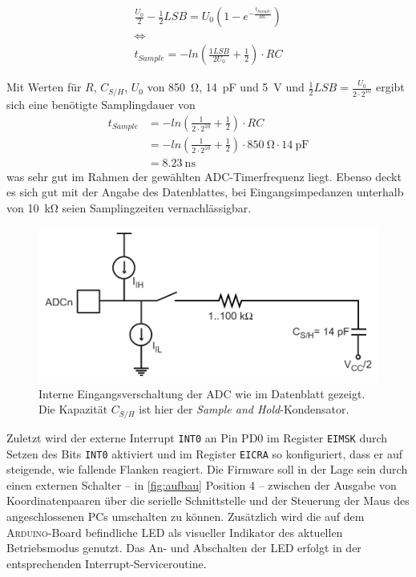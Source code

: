 		\begin{gather}
			\frac{U_0}{2} - \frac{1}{2}LSB = U_0 \left( 1 - e^{-\frac{t_{Sample}}{RC}} \right) \nonumber \\
			\Leftrightarrow \nonumber \\
			t_{Sample} = -ln\left( \frac{1LSB}{2U_0} + \frac{1}{2}\right) \cdot RC
			\label{eq:samplingzeit}
		\end{gather}

		Mit Werten für \(R\), \(C_{S/H}\), \(U_0\) von \SI{850}{\ohm}, \SI{14}{\pico\farad} und \SI{5}{\volt} und \(\frac{1}{2}LSB = \frac{U_0}{2 \cdot 2^{10}}\) ergibt sich eine benötigte Samplingdauer von
		\begin{align}
			t_{Sample}	&= -ln\left( \frac{1}{2\cdot 2^{10}} + \frac{1}{2}\right) \cdot RC \nonumber \\
						&= -ln\left( \frac{1}{2\cdot 2^{10}} + \frac{1}{2}\right) \cdot \SI{850}{\ohm} \cdot \SI{14}{\pico\farad} \nonumber \\
						&= \SI{8,23}{\nano\second}
			\label{eq:samplingzeit gerechnet}
		\end{align}
		was sehr gut im Rahmen der gewählten ADC-Timerfrequenz liegt.
		Ebenso deckt es sich gut mit der Angabe des Datenblattes, bei Eingangsimpedanzen unterhalb von \SI{10}{\kilo\ohm} seien Samplingzeiten vernachlässigbar.
		\begin{figure}[h]
			\centering
			\includegraphics[width=.8\textwidth]{fig/raster/adc-input-circuit.png}
			\caption[Interne Eingangsverschaltung der ADC]{Interne Eingangsverschaltung der ADC wie im Datenblatt gezeigt. Die Kapazität \(C_{S/H}\) ist hier der \textit{Sample and Hold}-Kondensator.}
			\label{fig:analog input circuitry}
		\end{figure}

		Zuletzt wird der externe Interrupt \texttt{INT0} an Pin PD0 im Register \texttt{EIMSK} durch Setzen des Bits \texttt{INT0} aktiviert und im Register \texttt{EICRA} so konfiguriert, dass er auf steigende, wie fallende Flanken reagiert.
		Die Firmware soll in der Lage sein durch einen externen Schalter -- in \cref{fig:aufbau} Position 4 -- zwischen der Ausgabe von Koordinatenpaaren über die serielle Schnittstelle und der Steuerung der Maus des angeschlossenen PCs umschalten zu können. Zusätzlich wird die auf dem \textsc{Arduino}-Board befindliche LED als visueller Indikator des aktuellen Betriebsmodus genutzt.
		Das An- und Abschalten der LED erfolgt in der entsprechenden Interrupt-Serviceroutine.\par

